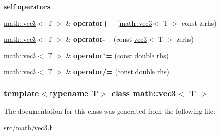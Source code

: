 \begin{Indent}{\bf self operators}\par
{\em \label{_amgrpf8b7a2ea730234c9f4b728de7bf6a056}
 }\begin{DoxyCompactItemize}
\item 
\hypertarget{classmath_1_1vec3_a04f6aee5e3b4bcf9283b844bd279b399}{
\hyperlink{classmath_1_1vec3}{math::vec3}$<$ T $>$ \& {\bfseries operator+=} (\hyperlink{classmath_1_1vec3}{math::vec3}$<$ T $>$ const \&rhs)}
\label{classmath_1_1vec3_a04f6aee5e3b4bcf9283b844bd279b399}

\item 
\hypertarget{classmath_1_1vec3_ad46ac632fb51c7dbcd0bf92bff1da878}{
\hyperlink{classmath_1_1vec3}{math::vec3}$<$ T $>$ \& {\bfseries operator-\/=} (const \hyperlink{classmath_1_1vec3}{vec3}$<$ T $>$ \&rhs)}
\label{classmath_1_1vec3_ad46ac632fb51c7dbcd0bf92bff1da878}

\item 
\hypertarget{classmath_1_1vec3_a816296f3311ad6124f7f210a047ca9a7}{
\hyperlink{classmath_1_1vec3}{math::vec3}$<$ T $>$ \& {\bfseries operator$\ast$=} (const double rhs)}
\label{classmath_1_1vec3_a816296f3311ad6124f7f210a047ca9a7}

\item 
\hypertarget{classmath_1_1vec3_ae189ca8cec1e6548d3603e81addeeda3}{
\hyperlink{classmath_1_1vec3}{math::vec3}$<$ T $>$ \& {\bfseries operator/=} (const double rhs)}
\label{classmath_1_1vec3_ae189ca8cec1e6548d3603e81addeeda3}

\end{DoxyCompactItemize}
\end{Indent}
\subsubsection*{template$<$typename T$>$ class math::vec3$<$ T $>$}



The documentation for this class was generated from the following file:\begin{DoxyCompactItemize}
\item 
src/math/vec3.h\end{DoxyCompactItemize}
